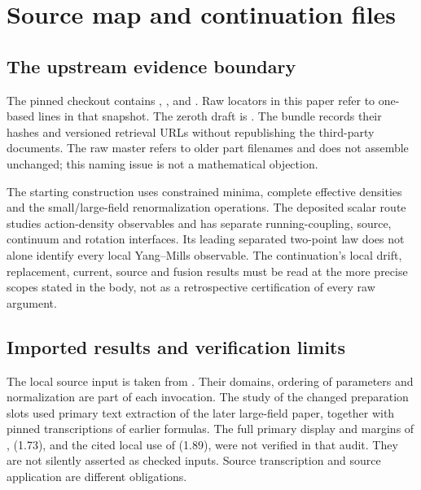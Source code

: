 \appendix
\section{Source map and continuation files}

\subsection{The upstream evidence boundary}

The pinned checkout contains
,
, and
.
Raw locators in this paper refer to one-based lines in that snapshot.
The zeroth draft is .
The bundle records their hashes and versioned retrieval URLs without
republishing the third-party documents. The raw master refers to older
part filenames and does not assemble unchanged; this naming issue is
not a mathematical objection.

The starting construction uses constrained minima, complete effective
densities and the small/large-field renormalization operations. The
deposited scalar route studies action-density observables and has
separate running-coupling, source, continuum and rotation interfaces.
Its leading separated two-point law does not alone identify every local
Yang--Mills observable. The continuation's local drift, replacement,
current, source and fusion results must be read at the more precise
scopes stated in the body, not as a retrospective certification of
every raw argument.

\subsection{Imported results and verification limits}

The local source input is taken from \cite{BalabanMinima,BalabanRGI,
BalabanRGII,BalabanConvergent,BalabanLargeI,BalabanLargeII}. Their domains,
ordering of parameters and normalization are part of each invocation.
The study of the changed preparation slots used primary text extraction
of the later large-field paper, together with pinned transcriptions of
earlier formulas. The full primary display and margins of
\cite{BalabanLargeI}, (1.73), and the cited local use of (1.89), were not
verified in that audit. They are not silently asserted as checked inputs.
Source transcription and source application are different obligations.

